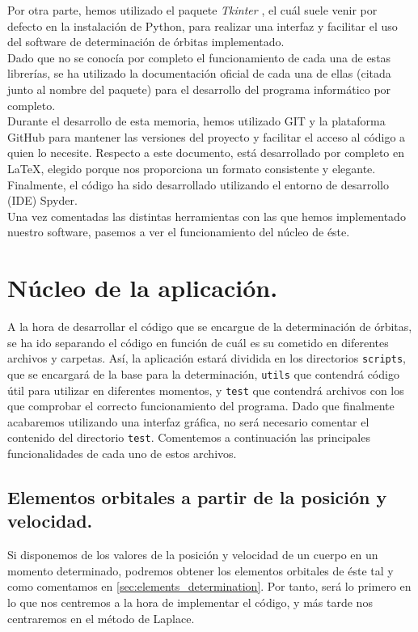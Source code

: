 \documentclass[11pt]{book}
\begin{document}
Por otra parte, hemos utilizado el paquete \textit{Tkinter} \cite{tkinter}, el cuál suele venir por defecto en la instalación de Python, para realizar una interfaz y facilitar el uso del software de determinación de órbitas implementado.\\

Dado que no se conocía por completo el funcionamiento de cada una de estas librerías, se ha utilizado la documentación oficial de cada una de ellas (citada junto al nombre del paquete) para el desarrollo del programa informático por completo.\\

Durante el desarrollo de esta memoria, hemos utilizado GIT y la plataforma GitHub para mantener las versiones del proyecto y facilitar el acceso al código a quien lo necesite. Respecto a este documento, está desarrollado por completo en \LaTeX, elegido porque nos proporciona un formato consistente y elegante. Finalmente, el código ha sido desarrollado utilizando el entorno de desarrollo (IDE) Spyder.\\

Una vez comentadas las distintas herramientas con las que hemos implementado nuestro software, pasemos a ver el funcionamiento del núcleo de éste.\\

\section{Núcleo de la aplicación.}
\label{sec:kernel}
A la hora de desarrollar el código que se encargue de la determinación de órbitas, se ha ido separando el código en función de cuál es su cometido en diferentes archivos y carpetas. Así, la aplicación estará dividida en los directorios \texttt{scripts}, que se encargará de la base para la determinación, \texttt{utils} que contendrá código útil para utilizar en diferentes momentos, y \texttt{test} que contendrá archivos con los que comprobar el correcto funcionamiento del programa. Dado que finalmente acabaremos utilizando una interfaz gráfica, no será necesario comentar el contenido del directorio \texttt{test}. Comentemos a continuación las principales funcionalidades de cada uno de estos archivos.\\

\subsection{Elementos orbitales a partir de la posición y velocidad.}
\label{subsec:orbital_elements_code}
Si disponemos de los valores de la posición y velocidad de un cuerpo en un momento determinado, podremos obtener los elementos orbitales de éste tal y como comentamos en \ref{sec:elements_determination}. Por tanto, será lo primero en lo que nos centremos a la hora de implementar el código, y más tarde nos centraremos en el método de Laplace.\\
\end{document}
